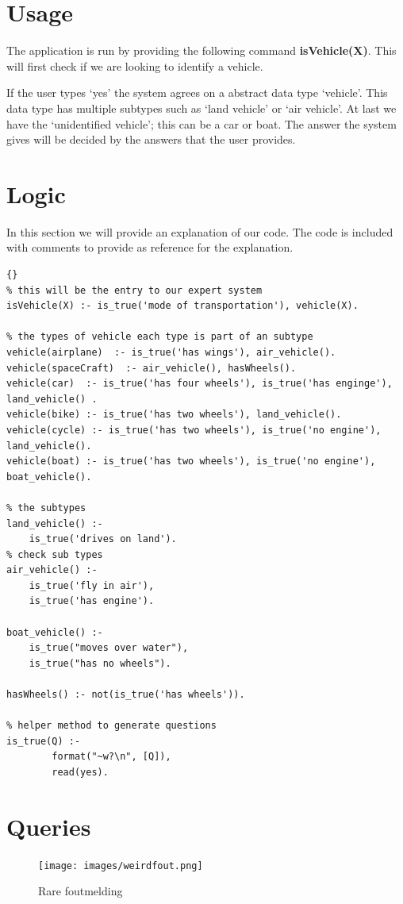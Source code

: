 \section{Usage} \label{man-usage}
The application is run by providing the following command \textbf{isVehicle(X)}.
This will first check if we are looking to identify a vehicle.

If the user types `yes' the system agrees on a abstract data type `vehicle'.
This data type has multiple subtypes such as `land vehicle' or `air vehicle'.
At last we have the `unidentified vehicle'; this can be a car or boat.
The answer the system gives will be decided by the answers that the user provides.

\newpage
\section{Logic} \label{man-logic}
In this section we will provide an explanation of our code.
The code is included with comments to provide as reference for the explanation.

\begin{lstlisting}{}
% this will be the entry to our expert system
isVehicle(X) :- is_true('mode of transportation'), vehicle(X).

% the types of vehicle each type is part of an subtype
vehicle(airplane)  :- is_true('has wings'), air_vehicle().
vehicle(spaceCraft)  :- air_vehicle(), hasWheels().
vehicle(car)  :- is_true('has four wheels'), is_true('has enginge'), land_vehicle() .
vehicle(bike) :- is_true('has two wheels'), land_vehicle().
vehicle(cycle) :- is_true('has two wheels'), is_true('no engine'), land_vehicle().
vehicle(boat) :- is_true('has two wheels'), is_true('no engine'), boat_vehicle().

% the subtypes
land_vehicle() :-
	is_true('drives on land').
% check sub types
air_vehicle() :-
	is_true('fly in air'),
	is_true('has engine').

boat_vehicle() :-
	is_true("moves over water"),
    is_true("has no wheels").

hasWheels() :- not(is_true('has wheels')).

% helper method to generate questions
is_true(Q) :-
        format("~w?\n", [Q]),
        read(yes).
\end{lstlisting}

\newpage
\section{Queries} \label{man-queries}

\begin{figure}[!h]
    \centering
    \texttt{[image: images/weirdfout.png]}
    \caption{Rare foutmelding}
    \label{fig:rareFout}
\end{figure}{}
